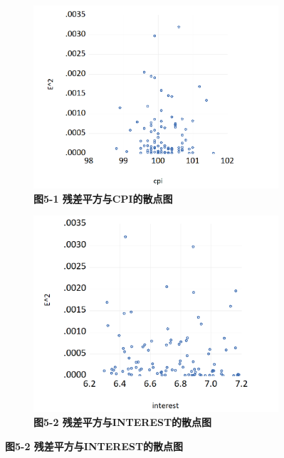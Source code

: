 \documentclass[12pt, a4paper]{article}
\numberwithin{equation}{section}
\begin{document}
\begin{figure}[h!]
    \centering
    \begin{subfigure}{0.45\textwidth}
        \includegraphics[width=\textwidth]{./img/cpi-e2.png}
        \captionsetup{labelformat=empty}
        \caption{\textbf{\fontsize{9pt}{11pt}\selectfont 图5-1 残差平方与CPI的散点图}}
    \end{subfigure}
    \hspace{0.05\textwidth}
    \begin{subfigure}{0.45\textwidth}
        \includegraphics[width=\textwidth]{./img/interest-e2.png}
        \captionsetup{labelformat=empty}
        \caption{\textbf{\fontsize{9pt}{11pt}\selectfont 图5-2 残差平方与INTEREST的散点图}}

\end{subfigure}
\end{figure}
\end{document}
